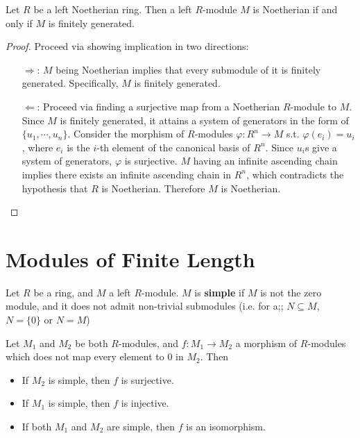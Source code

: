 \documentclass{article}
\begin{document}
\begin{proposition}\label{prop:Noeth modules on Noeth rings}
    Let $R$ be a left Noetherian ring. Then a left $R$-module $M$ is Noetherian if and only if $M$ is finitely generated.
\end{proposition}

\begin{proof}
    Proceed via showing implication in two directions:
    \begin{itemize}
        \item[$\Rightarrow$:] $M$ being Noetherian implies that every submodule of it is finitely generated. Specifically, $M$ is finitely generated. 
        \item[$\Leftarrow$:] Proceed via finding a surjective map from a Noetherian $R$-module to $M$. Since $M$ is finitely generated, it attains a system of generators in the form of $\{ u_1, \cdots, u_n \}$. Consider the morphism of $R$-modules $\varphi: R^n \to M$ s.t. $\varphi(e_i) = u_i$, where $e_i$ is the $i$-th element of the canonical basis of $R^n$. Since $u_i$s give a system of generators, $\varphi$ is surjective. $M$ having an infinite ascending chain implies there exists an infinite ascending chain in $R^n$, which contradicts the hypothesis that $R$ is Noetherian. Therefore $M$ is Noetherian.
    \end{itemize}
\end{proof}

\section{Modules of Finite Length}

\begin{definition}
    Let $R$ be a ring, and $M$ a left $R$-module. $M$ is \textbf{simple} if $M$ is not the zero module, and it does not admit non-trivial submodules (i.e. for a;; $N \subseteq M$, $N = \{0\}$ or $N = M$)
\end{definition}

\begin{proposition}\label{prop:Morphism between simple modules}
    Let $M_1$ and $M_2$ be both $R$-modules, and $f: M_1\to M_2$ a morphism of $R$-modules which does not map every element to 0 in $M_2$. Then 
    \begin{itemize}
        \item If $M_2$ is simple, then $f$ is surjective.
        \item If $M_1$ is simple, then $f$ is injective.
        \item If both $M_1$ and $M_2$ are simple, then $f$ is an isomorphism.
    \end{itemize}
\end{proposition}
\end{document}
